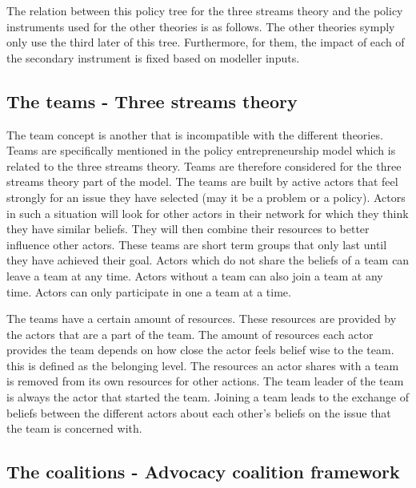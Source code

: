 The relation between this policy tree for the three streams theory and the policy instruments used for the other theories is as follows. The other theories symply only use the third later of this tree. Furthermore, for them, the impact of each of the secondary instrument is fixed based on modeller inputs.

%
\subsection{The teams - Three streams theory}
\label{ssec:teams3S}

The team concept is another that is incompatible with the different theories. Teams are specifically mentioned in the policy entrepreneurship model which is related to the three streams theory. Teams are therefore considered for the three streams theory part of the model. The teams are built by active actors that feel strongly for an issue they have selected (may it be a problem or a policy). Actors in such a situation will look for other actors in their network for which they think they have similar beliefs. They will then combine their resources to better influence other actors. These teams are short term groups that only last until they have achieved their goal. Actors which do not share the beliefs of a team can leave a team at any time. Actors without a team can also join a team at any time. Actors can only participate in one a team at a time.

The teams have a certain amount of resources. These resources are provided by the actors that are a part of the team. The amount of resources each actor provides the team depends on how close the actor feels belief wise to the team. this is defined as the belonging level. The resources an actor shares with a team is removed from its own resources for other actions. The team leader of the team is always the actor that started the team. Joining a team leads to the exchange of beliefs between the different actors about each other's beliefs on the issue that the team is concerned with. 

%
\subsection{The coalitions - Advocacy coalition framework}
\label{ssec:coalitionACF}

